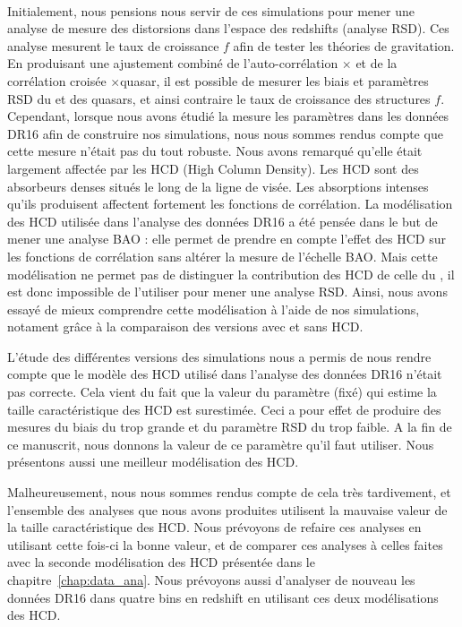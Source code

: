 \paragraph{}
Initialement, nous pensions nous servir de ces simulations pour mener une analyse de mesure des distorsions dans l'espace des redshifts (analyse RSD). Ces analyse mesurent le taux de croissance $f$ afin de tester les théories de gravitation.
En produisant une ajustement combiné de l'auto-corrélation \lya{}$\times$\lya{} et de la corrélation croisée \lya{}$\times$quasar, il est possible de mesurer les biais et paramètres RSD du \lya{} et des quasars, et ainsi contraire le taux de croissance des structures $f$.
Cependant, lorsque nous avons étudié la mesure les paramètres \lya{} dans les données DR16 afin de construire nos simulations, nous nous sommes rendus compte que cette mesure n'était pas du tout robuste.
Nous avons remarqué qu'elle était largement affectée par les HCD (High Column Density). Les HCD sont des absorbeurs denses situés le long de la ligne de visée. Les absorptions intenses qu'ils produisent affectent fortement les fonctions de corrélation.
La modélisation des HCD utilisée dans l'analyse des données DR16 a été pensée dans le but de mener une analyse BAO : elle permet de prendre en compte l'effet des HCD sur les fonctions de corrélation sans altérer la mesure de l'échelle BAO.
Mais cette modélisation ne permet pas de distinguer la contribution des HCD de celle du \lya{}, il est donc impossible de l'utiliser pour mener une analyse RSD.
Ainsi, nous avons essayé de mieux comprendre cette modélisation à l'aide de nos simulations, notament grâce à la comparaison des versions avec et sans HCD.

L'étude des différentes versions des simulations nous a permis de nous rendre compte que le modèle des HCD utilisé dans l'analyse des données DR16 n'était pas correcte. Cela vient du fait que la valeur du paramètre (fixé) qui estime la taille caractéristique des HCD est surestimée. Ceci a pour effet de produire des mesures du biais du \lya{} trop grande et du paramètre RSD du \lya{} trop faible.
A la fin de ce manuscrit, nous donnons la valeur de ce paramètre qu'il faut utiliser. Nous présentons aussi une meilleur modélisation des HCD.

Malheureusement, nous nous sommes rendus compte de cela très tardivement, et l'ensemble des analyses que nous avons produites utilisent la mauvaise valeur de la taille caractéristique des HCD. Nous prévoyons de refaire ces analyses en utilisant cette fois-ci la bonne valeur, et de comparer ces analyses à celles faites avec la seconde modélisation des HCD présentée dans le chapitre~\ref{chap:data_ana}.
Nous prévoyons aussi d'analyser de nouveau les données DR16 dans quatre bins en redshift en utilisant ces deux modélisations des HCD.

